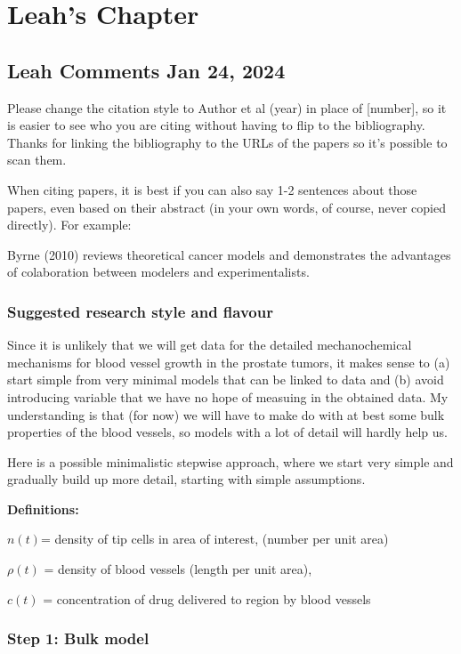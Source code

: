 \chapter{Leah's Chapter}


	
\section{Leah Comments Jan 24, 2024}
Please change the citation style to Author et al (year) in place of [number], so it is easier to see who you are citing without having to flip to the bibliography. Thanks for linking the bibliography to the URLs of the papers so it's possible to scan them.

When citing papers, it is best if you can also say 1-2 sentences about those papers, even based on their abstract (in your own words, of course, never copied directly). For example:

Byrne (2010) reviews theoretical cancer models and demonstrates the advantages of colaboration between modelers and experimentalists.

\subsection{Suggested research style and flavour}

Since it is unlikely that we will get data for the detailed mechanochemical mechanisms for blood vessel growth in the prostate tumors, it makes sense to (a) start simple from very minimal models that can be linked to data and (b) avoid introducing variable that we have no hope of measuing in the obtained data. My understanding is that (for now) we will have to make do with at best some bulk properties of the blood vessels, so models with a lot of detail will hardly help us.

Here is a possible minimalistic stepwise approach, where we start very simple and gradually build up more detail, starting with simple assumptions.

\textbf{Definitions:} 

$n(t)$= density of tip cells in area of interest, (number per unit area)

$\rho(t)$ = density of blood vessels (length per unit area),

$c(t)$ = concentration of drug delivered to region by blood vessels



\subsection{Step 1: Bulk model}

